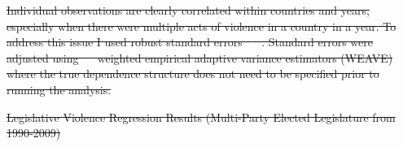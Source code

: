 \documentclass[a4paper]{article}\usepackage[]{graphicx}\usepackage[]{color}
\providecommand{\DIFdeltex}[1]{{\protect\color{red}\sout{#1}}}                      %
\providecommand{\DIFaddbegin}{} %
\providecommand{\DIFaddend}{} %
\providecommand{\DIFdelbegin}{} %
\providecommand{\DIFdelend}{} %
\providecommand{\DIFdel}[1]{\texorpdfstring{\DIFdeltex{#1}}{}} %
\begin{document}
\DIFdelbegin \DIFdel{Individual observations are clearly correlated within countries and years, especially when there were multiple acts of violence in a country in a year. To address this issue I used robust standard errors \mbox{%
\citep{Golder2006, Mainwaring2007}
}%
. Standard errors were adjusted using \mbox{%
\cite{Lumley1999}
}%
weighted empirical adaptive variance estimators (WEAVE) where the true dependence structure does not need to be specified prior to running the analysis.
}\DIFdelend \DIFaddbegin \vspace{0.5cm}
\DIFaddend 

\DIFdelbegin %
{%
\DIFdel{Legislative Violence Regression Results (Multi-Party Elected Legislature from 1990-2009)}}
\end{document}
